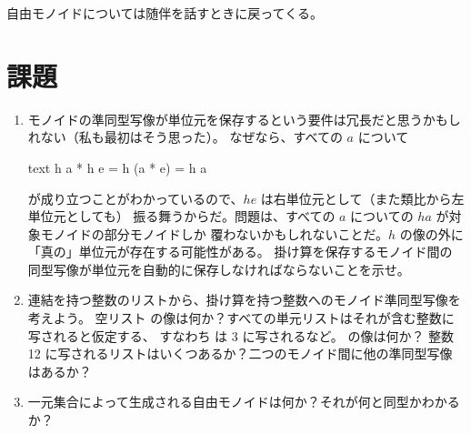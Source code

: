自由モノイドについては随伴を話すときに戻ってくる。

\section{課題}

\begin{enumerate}
  \tightlist
  \item
        モノイドの準同型写像が単位元を保存するという要件は冗長だと思うかもしれない（私も最初はそう思った）。
        なぜなら、すべての $a$ について

        \begin{snip}{text}
h a * h e = h (a * e) = h a
\end{snip}
        が成り立つことがわかっているので、$h e$ は右単位元として（また類比から左単位元としても）
        振る舞うからだ。問題は、すべての $a$ についての $h a$ が対象モノイドの部分モノイドしか
        覆わないかもしれないことだ。$h$ の像の外に「真の」単位元が存在する可能性がある。
        掛け算を保存するモノイド間の同型写像が単位元を自動的に保存しなければならないことを示せ。
  \item
        連結を持つ整数のリストから、掛け算を持つ整数へのモノイド準同型写像を考えよう。
        空リスト \code{{[}{]}} の像は何か？すべての単元リストはそれが含む整数に写されると仮定する、
        すなわち \code{{[}3{]}} は 3 に写されるなど。\code{{[}1, 2, 3, 4{]}} の像は何か？
        整数 12 に写されるリストはいくつあるか？二つのモノイド間に他の準同型写像はあるか？
  \item
        一元集合によって生成される自由モノイドは何か？それが何と同型かわかるか？
\end{enumerate}
